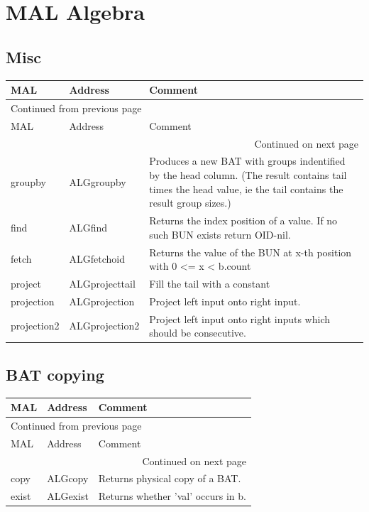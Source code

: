 \documentclass[11pt]{article}
\begin{document}
\pagebreak

\section{MAL Algebra}
\label{sec:orgb0681c2}
\subsection{Misc}
\label{sec:orgf6ab7d4}
\begin{longtable}{|l|l|p{10cm}|}
\hline
MAL & Address & Comment\\
\hline
\endfirsthead
\multicolumn{3}{l}{Continued from previous page} \\
\hline

MAL & Address & Comment \\

\hline
\endhead
\hline\multicolumn{3}{r}{Continued on next page} \\
\endfoot
\endlastfoot
\hline
groupby & ALGgroupby & Produces a new BAT with groups indentified by the head column. (The result contains tail times the head value, ie the tail contains the result group sizes.)\\
\hline
find & ALGfind & Returns the index position of a value. If no such BUN exists return OID-nil.\\
\hline
fetch & ALGfetchoid & Returns the value of the BUN at x-th position with 0 <= x < b.count\\
\hline
project & ALGprojecttail & Fill the tail with a constant\\
\hline
projection & ALGprojection & Project left input onto right input.\\
\hline
projection2 & ALGprojection2 & Project left input onto right inputs which should be consecutive.\\
\hline
\end{longtable}

\subsection{BAT copying}
\label{sec:orga3236dd}
\begin{longtable}{|l|l|p{10cm}|}
\hline
MAL & Address & Comment\\
\hline
\endfirsthead
\multicolumn{3}{l}{Continued from previous page} \\
\hline

MAL & Address & Comment \\

\hline
\endhead
\hline\multicolumn{3}{r}{Continued on next page} \\
\endfoot
\endlastfoot
\hline
copy & ALGcopy & Returns physical copy of a BAT.\\
\hline
exist & ALGexist & Returns whether 'val' occurs in b.\\
\hline
\end{longtable}
\end{document}
